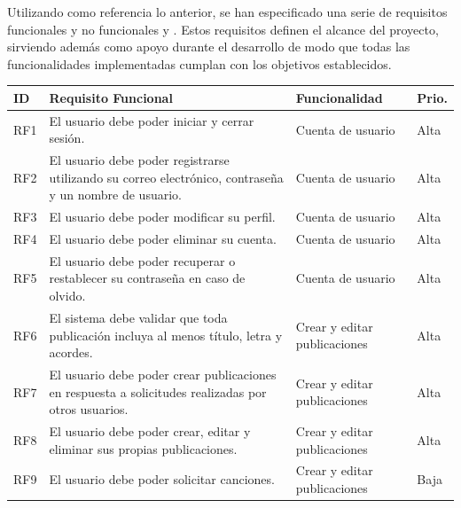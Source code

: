 Utilizando como referencia lo anterior, se han especificado una serie de requisitos funcionales y no funcionales  y . Estos requisitos definen el alcance del proyecto, sirviendo además como apoyo durante el desarrollo de modo que todas las funcionalidades implementadas cumplan con los objetivos establecidos.

\begin{table}[H]
    \centering
    \scriptsize
    \begin{tabular}{l p{} p{} l}
        \textbf{ID} & \textbf{Requisito Funcional} & \textbf{Funcionalidad} & \textbf{Prio.} \\ \hline
        RF1  & El usuario debe poder iniciar y cerrar sesión. & Cuenta de usuario & Alta \\ \hline
        RF2  & El usuario debe poder registrarse utilizando su correo electrónico, contraseña y un nombre de usuario. & Cuenta de usuario & Alta \\ \hline
        RF3  & El usuario debe poder modificar su perfil. & Cuenta de usuario & Alta \\ \hline
        RF4  & El usuario debe poder eliminar su cuenta. & Cuenta de usuario & Alta \\ \hline
        RF5  & El usuario debe poder recuperar o restablecer su contraseña en caso de olvido. & Cuenta de usuario & Alta \\ \hline

        RF6  & El sistema debe validar que toda publicación incluya al menos título, letra y acordes. & Crear y editar publicaciones & Alta \\ \hline
        RF7  & El usuario debe poder crear publicaciones en respuesta a solicitudes realizadas por otros usuarios. & Crear y editar publicaciones & Alta \\ \hline
        RF8  & El usuario debe poder crear, editar y eliminar sus propias publicaciones. & Crear y editar publicaciones & Alta \\ \hline
        RF9  & El usuario debe poder solicitar canciones. & Crear y editar publicaciones & Baja \\ \hline


\end{tabular}
\end{table}
